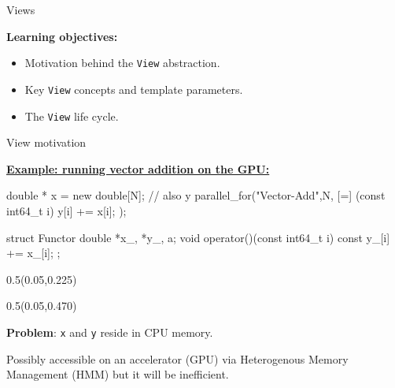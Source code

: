 
\begin{frame}[fragile]

  {\Huge Views}

  \vspace{20pt}

  \textbf{Learning objectives:}
  \begin{itemize}
    \item{Motivation behind the \texttt{View} abstraction.}
    \item{Key \texttt{View} concepts and template parameters.}
    \item{The \texttt{View} life cycle.}
  \end{itemize}

  \vspace{-20pt}

\end{frame}


\begin{frame}[fragile]{View motivation}

  \textbf{\ul{Example: running vector addition on the GPU:}}

  \vspace{5pt}

  \begin{code}[linebackgroundcolor={
        \btLstHL<2->{3}{red!30}
      },
      frame=single
    ]
double * x = new double[N]; // also y
parallel_for("Vector-Add",N, [=] (const int64_t i) {
    y[i] += x[i];
  });
  \end{code}

  \begin{code}[linebackgroundcolor={
        \btLstHL<2->{2,4}{red!30}
      },
      frame=single
    ]
struct Functor {
  double *x_, *y_, a;
  void operator()(const int64_t i) const {
    y_[i] += x_[i];
  }
};
  \end{code}

  \begin{textblock*}{0.5\textwidth}(0.05\textwidth,0.225\textheight)
  \end{textblock*}

  \begin{textblock*}{0.5\textwidth}(0.05\textwidth,0.470\textheight)
  \end{textblock*}

  \vspace{5pt}
  \pause

  \textbf{{\color{red}Problem}}: \texttt{x} and \texttt{y} reside in CPU memory.

  \vspace{5pt}

  Possibly accessible on an accelerator (GPU) via Heterogenous Memory Management (HMM) but it will be inefficient.

  \vspace{10pt}

\end{frame}

